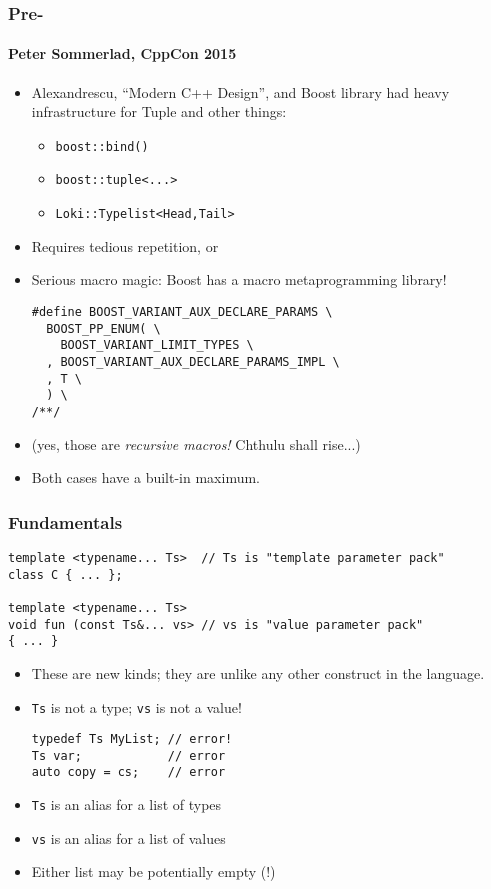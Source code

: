 \begin{frame}[fragile,t]
\frametitle{Pre-}
\framesubtitle{Peter Sommerlad, CppCon 2015}
\begin{itemize}[<+->]
\item Alexandrescu, ``Modern C++ Design'', and Boost library had heavy
  infrastructure for Tuple and other things:
  \begin{itemize}
    \item \texttt{boost::bind()}
    \item \texttt{boost::tuple<...>}
    \item \texttt{Loki::Typelist<Head,Tail>}
  \end{itemize}
\item Requires tedious repetition, or
\item Serious macro magic: Boost has a macro metaprogramming library!
{\scriptsize\begin{verbatim}
#define BOOST_VARIANT_AUX_DECLARE_PARAMS \
  BOOST_PP_ENUM( \
    BOOST_VARIANT_LIMIT_TYPES \
  , BOOST_VARIANT_AUX_DECLARE_PARAMS_IMPL \
  , T \
  ) \
/**/
\end{verbatim}
}
\item (yes, those are \emph{recursive macros!} Chthulu shall rise...)
\item Both cases have a built-in maximum.
\end{itemize}
\end{frame}



\begin{frame}[fragile,t]
\frametitle{Fundamentals}
{\scriptsize\begin{verbatim}
template <typename... Ts>  // Ts is "template parameter pack"
class C { ... };

template <typename... Ts>
void fun (const Ts&... vs> // vs is "value parameter pack"
{ ... } 
\end{verbatim}
}
\begin{itemize}[<+->]

\item These are new kinds; they are unlike any other construct in the language.

\item \texttt{Ts} is not a type; \texttt{vs} is not a value!
{\scriptsize\begin{verbatim}
typedef Ts MyList; // error!
Ts var;            // error
auto copy = cs;    // error
\end{verbatim}
}
\item \texttt{Ts} is an alias for a list of types
\item \texttt{vs} is an alias for a list of values
\item Either list may be potentially empty (!)
\end{itemize}
\end{frame}


